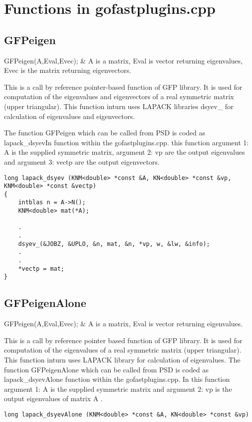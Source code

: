 \section{Functions in gofastplugins.cpp}

\subsection{GFPeigen}

\begin{conditions*}
GFPeigen(A,Eval,Evec); & {\ttfamily A} is a matrix, {\ttfamily Eval} is vector returning eigenvalues, {\ttfamily Evec} is the matrix returning eigenvectors.
\end{conditions*}
This is a call by reference pointer-based function of GFP library. It is used for computation of the eigenvalues and eigenvectors of a real symmetric matrix (upper triangular). This function inturn uses LAPACK libraries {\ttfamily dsyev\_} for calculation of eigenvalues and eigenvectors. 

The function {\ttfamily GFPeigen} which can be called from PSD is coded as {\ttfamily lapack\_dsyevIn} function within the gofastplugins.cpp.  this function argument 1: {\ttfamily A} is the supplied symmetric matrix, argument 2: {\ttfamily vp}  are the output eigenvalues and argument 3: {\ttfamily vectp}  are the output eigenvectors.
\begin{lstlisting}[language=PSD]
long lapack_dsyev (KNM<double> *const &A, KN<double> *const &vp, KNM<double> *const &vectp) 
{
	intblas n = A->N();
	KNM<double> mat(*A);
	
    .
    .
    dsyev_(&JOBZ, &UPLO, &n, mat, &n, *vp, w, &lw, &info);
    .
    .
    *vectp = mat;
}
\end{lstlisting}


\subsection{GFPeigenAlone}

\begin{conditions*}
GFPeigen(A,Eval,Evec); & {\ttfamily A} is a matrix, {\ttfamily Eval} is vector returning eigenvalues.
\end{conditions*}

This is a call by reference pointer based function of GFP library. It is used for computation of the eigenvalues of a real symmetric matrix (upper triangular). This function inturn uses LAPACK library for calculation of eigenvalues. The function {\ttfamily GFPeigenAlone} which can be called from PSD is coded as {\ttfamily lapack\_dsyevAlone} function within the gofastplugins.cpp. In this function argument 1: {\ttfamily A} is the supplied symmetric matrix and argument 2: {\ttfamily vp}  is the output eigenvalues of matrix {\ttfamily A} .
\begin{lstlisting}[language=PSD]
long lapack_dsyevAlone (KNM<double> *const &A, KN<double> *const &vp)
\end{lstlisting}

